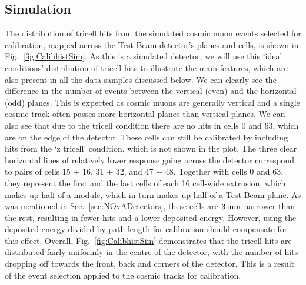 \subsection{Simulation}\label{sec:SimulationResults}
The distribution of tricell hits from the simulated cosmic muon events selected for calibration, mapped across the Test Beam detector's planes and cells, is shown in Fig.~\ref{fig:CalibhistSim}. As this is a simulated detector, we will use this `ideal conditions' distribution of tricell hits to illustrate the main features, which are also present in all the data samples discussed below. We can clearly see the difference in the number of events between the vertical (even) and the horizontal (odd) planes. This is expected as cosmic muons are generally vertical and a single cosmic track often passes more horizontal planes than vertical planes. We can also see that due to the tricell condition there are no hits in cells 0 and 63, which are on the edge of the detector. These cells can still be calibrated by including hits from the `z tricell' condition, which is not shown in the plot. The three clear horizontal lines of relatively lower response going across the detector correspond to pairs of cells 15 + 16, 31 + 32, and 47 + 48. Together with cells 0 and 63, they represent the first and the last cells of each 16 cell-wide extrusion, which makes up half of a module, which in turn makes up half of a Test Beam plane. As was mentioned in Sec.~\ref{sec:NOvADetectors}, these cells are $\unit[3]{mm}$ narrower than the rest, resulting in fewer hits and a lower deposited energy. However, using the deposited energy divided by path length for calibration should compensate for this effect. Overall, Fig.~\ref{fig:CalibhistSim} demonstrates that the tricell hits are distributed fairly uniformly in the centre of the detector, with the number of hits dropping off towards the front, back and corners of the detector. This is a result of the event selection applied to the cosmic tracks for calibration.

